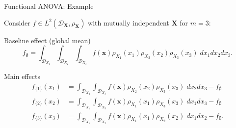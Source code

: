 \documentclass[english,aspectratio=169]{beamer}
\let\tempone\itemize
\let\temptwo\enditemize
\renewenvironment{itemize}{\tempone\addtolength{\itemsep}{0.35\baselineskip}}{\temptwo}
\renewcommand{\emph}[1]{\textcolor[HTML]{006d2c}{\fontseries{sb}\selectfont #1}}
\begin{document}
\begin{frame}[fragile]{Functional ANOVA: Example}
\small

\vspace{-1em}

Consider $f \in L^2(\mathcal{D}_{\boldsymbol{X}}, \rho_{\boldsymbol{X}})$ with mutually independent $\bm{X}$ for $m = 3$:
\vspace{1.0em}
\begin{itemize}
  \item \emph{Baseline effect} (global mean)
  \begin{equation*}
    f_\emptyset = \int_{\mathcal{D}_{X_1}} \int_{\mathcal{D}_{X_2}} \int_{\mathcal{D}_{X_3}} f(\bm{x}) \rho_{X_1} (x_1) \rho_{X_2} (x_2) \rho_{X_3} (x_3) \; dx_1 dx_2 dx_3.
  \end{equation*}
  
  \item \emph{Main effects}
  \begin{align*}
    f_{\{ 1 \}} (x_1) & = \int_{\mathcal{D}_{X_2}} \int_{\mathcal{D}_{X_3}} f (\bm{x}) \rho_{X_2} (x_2) \rho_{X_3} (x_3) \; dx_2 dx_3 - f_\emptyset \\
    f_{\{ 2 \}} (x_2) & = \int_{\mathcal{D}_{X_1}} \int_{\mathcal{D}_{X_3}} f (\bm{x}) \rho_{X_1} (x_1) \rho_{X_3} (x_3) \; dx_1 dx_3 - f_\emptyset \\
    f_{\{ 3 \}} (x_3) & = \int_{\mathcal{D}_{X_1}} \int_{\mathcal{D}_{X_2}} f (\bm{x}) \rho_{X_1} (x_1) \rho_{X_2} (x_2) \; dx_1 dx_2 - f_\emptyset.
  \end{align*}

\end{itemize}

\end{frame}
\end{document}
